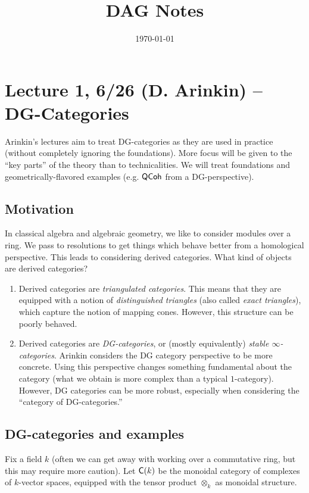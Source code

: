 \documentclass{amsart}
\title{DAG Notes}
\date{\today}
\begin{document}
\maketitle

\section{Lecture 1, 6/26 (D. Arinkin) -- DG-Categories}

Arinkin's lectures aim to treat DG-categories as they are used in practice (without completely ignoring the foundations).
More focus will be given to the ``key parts'' of the theory than to technicalities.
We will treat foundations and geometrically-flavored examples (e.g. $\mathsf{QCoh}$ from a DG-perspective).

\subsection{Motivation}

In classical algebra and algebraic geometry, we like to consider modules over a ring.
We pass to resolutions to get things which behave better from a homological perspective.
This leads to considering derived categories.
What kind of objects are derived categories?

\begin{enumerate}
\item Derived categories are \emph{triangulated categories}.
This means that they are equipped with a notion of \emph{distinguished triangles} (also called \emph{exact triangles}), which capture the notion of mapping cones.
However, this structure can be poorly behaved.
\item Derived categories are \emph{DG-categories}, or (mostly equivalently) \emph{stable $\infty$-categories}.
Arinkin considers the DG category perspective to be more concrete.
Using this perspective changes something fundamental about the category (what we obtain is more complex than a typical $1$-category).
However, DG categories can be more robust, especially when considering the ``category of DG-categories.''
\end{enumerate}

\subsection{DG-categories and examples}

Fix a field $k$ (often we can get away with working over a commutative ring, but this may require more caution).
Let $\mathsf{C}(k)$ be the monoidal category of complexes of $k$-vector spaces, equipped with the tensor product $\otimes_k$ as monoidal structure.
\end{document}
